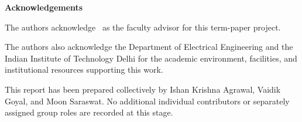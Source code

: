 \clearpage
\thispagestyle{ell305}
\vspace*{0.14\textheight}

\begin{center}
  {\Large\bfseries Acknowledgements\par}
\end{center}

\vspace{1.2cm}

The authors acknowledge \facultyadvisor\ as the faculty advisor for this term-paper project.

The authors also acknowledge the Department of Electrical Engineering and the Indian Institute of Technology Delhi for the academic environment, facilities, and institutional resources supporting this work.

This report has been prepared collectively by Ishan Krishna Agrawal, Vaidik Goyal, and Moon Saraswat. No additional individual contributors or separately assigned group roles are recorded at this stage.
